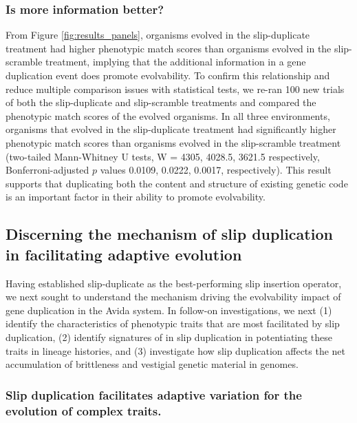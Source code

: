 \subsubsection{Is more information better?}
From Figure \ref{fig:results_panels}, organisms evolved in the slip-duplicate treatment had higher phenotypic match scores than organisms evolved in the slip-scramble treatment, implying that the additional information in a gene duplication event %
does
promote evolvability. To confirm this relationship and reduce multiple comparison issues with statistical tests, we re-ran 100 new trials of both the slip-duplicate and slip-scramble treatments %
and compared the phenotypic match scores of the evolved organisms. In all three environments, organisms that evolved in the slip-duplicate treatment had significantly higher phenotypic match scores than organisms evolved in the slip-scramble treatment (two-tailed Mann-Whitney U tests, W = 4305, 4028.5, 3621.5 respectively, Bonferroni-adjusted $p$ values 0.0109, 0.0222, 0.0017, respectively). This result supports that %
duplicating both the content and structure of existing genetic code is an important factor in their ability to promote evolvability.

\subsection{Discerning the mechanism of slip duplication in facilitating adaptive evolution}

Having established slip-duplicate as the best-performing slip insertion operator, we next sought to understand the mechanism driving the evolvability impact of gene duplication in the Avida system.
In follow-on investigations, we next (1) identify the characteristics of phenotypic traits that are most facilitated by slip duplication, (2) identify signatures of in slip duplication in potentiating these traits in lineage histories, and (3) investigate how slip duplication affects the net accumulation of brittleness and vestigial genetic material in genomes.

\subsubsection{Slip duplication facilitates adaptive variation for the evolution of complex traits.}

